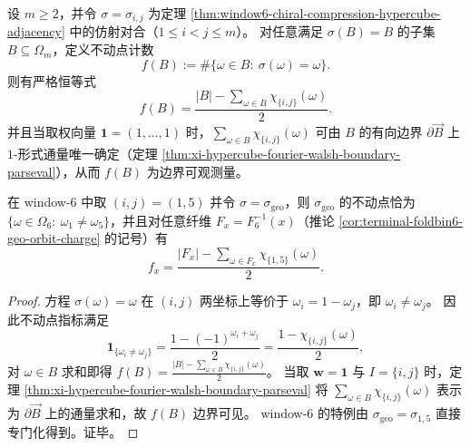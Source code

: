 
\begin{proposition}\label{prop:terminal-hypercube-affine-involution-fixedpoint-gauss-stokes}
设 \(m\ge 2\)，并令 \(\sigma=\sigma_{i,j}\) 为定理 \ref{thm:window6-chiral-compression-hypercube-adjacency} 中的仿射对合（\(1\le i<j\le m\)）。
对任意满足 \(\sigma(B)=B\) 的子集 \(B\subseteq\Omega_m\)，定义不动点计数
\[
f(B):=\#\{\omega\in B:\ \sigma(\omega)=\omega\}.
\]
则有严格恒等式
\[
f(B)=\frac{|B|-\sum_{\omega\in B}\chi_{\{i,j\}}(\omega)}{2}.
\]
并且当取权向量 \(\mathbf 1=(1,\dots,1)\) 时，\(\sum_{\omega\in B}\chi_{\{i,j\}}(\omega)\) 可由 \(B\) 的有向边界 \(\partial\overrightarrow{B}\) 上 \(1\)-形式通量唯一确定（定理 \ref{thm:xi-hypercube-fourier-walsh-boundary-parseval}），从而 \(f(B)\) 为边界可观测量。
\par
在 window-\(6\) 中取 \((i,j)=(1,5)\) 并令 \(\sigma=\sigma_{\mathrm{geo}}\)，则 \(\sigma_{\mathrm{geo}}\) 的不动点恰为 \(\{\omega\in\Omega_6:\ \omega_1\neq \omega_5\}\)，并且对任意纤维 \(F_x=F_6^{-1}(x)\)（推论 \ref{cor:terminal-foldbin6-geo-orbit-charge} 的记号）有
\[
f_x=\frac{|F_x|-\sum_{\omega\in F_x}\chi_{\{1,5\}}(\omega)}{2}.
\]
\end{proposition}
\begin{proof}
方程 \(\sigma(\omega)=\omega\) 在 \((i,j)\) 两坐标上等价于 \(\omega_i=1-\omega_j\)，即 \(\omega_i\neq \omega_j\)。
因此不动点指标满足
\[
\mathbf 1_{\{\omega_i\neq \omega_j\}}
=\frac{1-(-1)^{\omega_i+\omega_j}}{2}
=\frac{1-\chi_{\{i,j\}}(\omega)}{2},
\]
对 \(\omega\in B\) 求和即得
\(
f(B)=\frac{|B|-\sum_{\omega\in B}\chi_{\{i,j\}}(\omega)}{2}
\)。
当取 \(\mathbf w=\mathbf 1\) 与 \(I=\{i,j\}\) 时，定理 \ref{thm:xi-hypercube-fourier-walsh-boundary-parseval} 将
\(
\sum_{\omega\in B}\chi_{\{i,j\}}(\omega)
\)
表示为 \(\partial\overrightarrow{B}\) 上的通量求和，故 \(f(B)\) 边界可见。
window-\(6\) 的特例由 \(\sigma_{\mathrm{geo}}=\sigma_{1,5}\) 直接专门化得到。证毕。
\end{proof}

